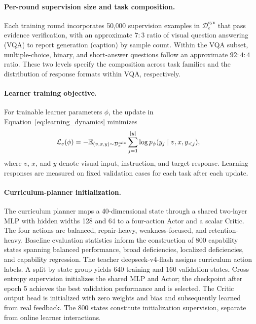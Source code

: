 \paragraph{Per-round supervision size and task composition.}
Each training round incorporates 50,000 supervision examples in $\mathcal D_e^{\mathrm{syn}}$ that pass evidence verification, with an approximate $7:3$ ratio of visual question answering (VQA) to report generation (caption) by sample count. Within the VQA subset, multiple-choice, binary, and short-answer questions follow an approximate $92:4:4$ ratio. These two levels specify the composition across task families and the distribution of response formats within VQA, respectively.

\paragraph{Learner training objective.}
\label{app:learner_objective}
For trainable learner parameters $\phi$, the update in Equation~\ref{eq:learning_dynamics} minimizes
\begin{equation}
\mathcal L_e(\phi)=-\mathbb E_{(v,x,y)\sim\mathcal D_e^{\mathrm{mix}}}
\sum_{j=1}^{|y|}\log p_\phi(y_j\mid v,x,y_{<j}),
\label{eq:student}
\end{equation}
where $v$, $x$, and $y$ denote visual input, instruction, and target response. Learning responses are measured on fixed validation cases for each task after each update.

\paragraph{Curriculum-planner initialization.}
The curriculum planner maps a 40-dimensional state through a shared two-layer MLP with hidden widths 128 and 64 to a four-action Actor and a scalar Critic. The four actions are balanced, repair-heavy, weakness-focused, and retention-heavy. Baseline evaluation statistics inform the construction of 800 capability states spanning balanced performance, broad deficiencies, localized deficiencies, and capability regression. The teacher deepseek-v4-flash assigns curriculum action labels. A split by state group yields 640 training and 160 validation states. Cross-entropy supervision initializes the shared MLP and Actor; the checkpoint after epoch 5 achieves the best validation performance and is selected. The Critic output head is initialized with zero weights and bias and subsequently learned from real feedback. The 800 states constitute initialization supervision, separate from online learner interactions.

